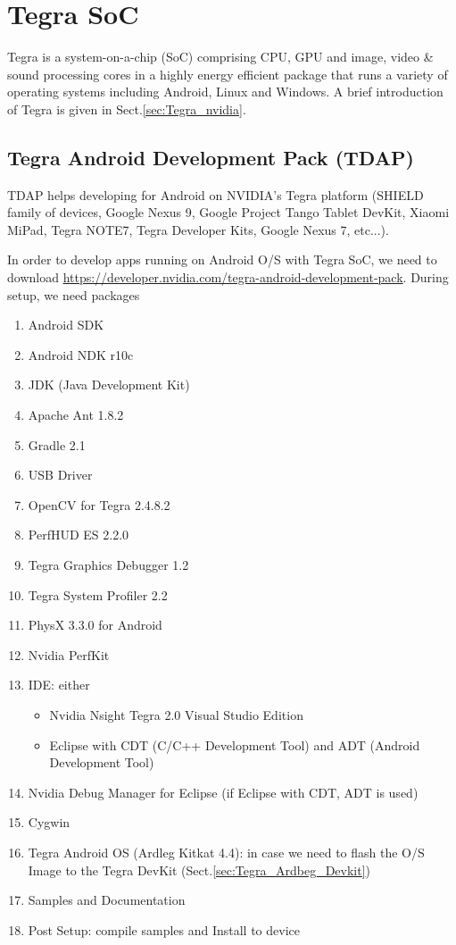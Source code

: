 \chapter{Tegra SoC}
\label{chap:Tegra}

Tegra is a system-on-a-chip (SoC) comprising CPU, GPU and image, video \& sound
processing cores in a highly energy efficient package that runs a variety of
operating systems including Android, Linux and Windows.  A brief introduction of
Tegra is given in Sect.\ref{sec:Tegra_nvidia}.

\section{Tegra Android Development Pack (TDAP)}
\label{sec:TDAP}

TDAP helps developing for Android on NVIDIA's Tegra platform (SHIELD family of 
devices, Google Nexus 9, Google Project Tango Tablet DevKit, Xiaomi MiPad, Tegra
NOTE7, Tegra Developer Kits, Google Nexus 7, etc...).

In order to develop apps running on Android O/S with Tegra SoC, we need to
download \url{https://developer.nvidia.com/tegra-android-development-pack}.
During setup, we need packages
\begin{enumerate}
  \item Android SDK
  \item Android NDK r10c
  \item JDK (Java Development Kit)
  \item Apache Ant 1.8.2
  \item Gradle 2.1
  \item USB Driver
  \item OpenCV for Tegra 2.4.8.2
  \item PerfHUD ES 2.2.0
  \item Tegra Graphics Debugger 1.2
  \item Tegra System Profiler 2.2
  \item PhysX 3.3.0 for Android
  \item Nvidia PerfKit
  \item IDE: either
  \begin{itemize}
    \item Nvidia Nsight Tegra 2.0 Visual Studio Edition
    \item Eclipse with CDT (C/C++ Development Tool) and ADT (Android Development
  Tool)
  \end{itemize}
  \item Nvidia Debug Manager for Eclipse (if Eclipse with CDT, ADT is used)
  \item Cygwin
  \item Tegra Android OS (Ardleg Kitkat 4.4): in case we need to flash the O/S
  Image to the Tegra DevKit (Sect.\ref{sec:Tegra_Ardbeg_Devkit})
  \item Samples and Documentation
  \item Post Setup: compile samples and Install to device
\end{enumerate}

